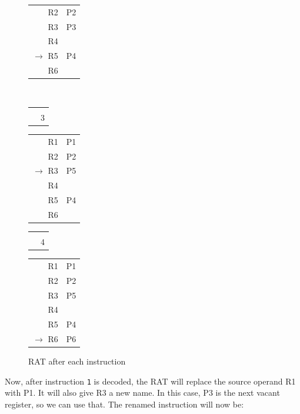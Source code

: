 \documentclass[12pt,a4paper]{article} %
\begin{document}
\begin{figure} [!htb]
\begin{minipage}{.2\textwidth}
\begin{tabularx} {\textwidth} {R | X|}
		R2					  & P2\\
		R3					  & P3\\
		R4					  & \\
		$\rightarrow$
		R5					  & P4\\
		R6					  & \\
	\end{tabularx}
	\end{minipage}
	\\%
	\vspace{0pt}%
	\hspace{.1\textwidth}%
	\begin{minipage}{.2\textwidth}
		\begin{tabularx} {\textwidth} {R  C}
			& \\
			& 3\\
		\end{tabularx}
	\begin{tabularx} {\textwidth} {R | X|}
		R1 					  & P1\\
		R2					  & P2\\
		$\rightarrow$
		R3					  & P5\\
		R4					  & \\
		R5					  & P4\\
		R6					  & \\
	\end{tabularx}
	\end{minipage}%
	\hspace{.1\textwidth}%
	\begin{minipage}{.2\textwidth}
		\begin{tabularx} {\textwidth} {R  C}
			& \\
			& 4\\
		\end{tabularx}
	\begin{tabularx} {\textwidth} {R | X|}
		R1 					  & P1\\
		R2					  & P2\\
		R3					  & P5\\
		R4					  & \\
		R5					  & P4\\
		$\rightarrow$
		R6					  & P6\\
	\end{tabularx}
	\end{minipage}%
	\vspace{.5cm}
	\caption{RAT after each instruction}
	\label{fig-RAT}
\end{figure}
Now, after instruction \texttt{1} is decoded, the RAT will replace the source operand R1 with P1. It will also give R3 a new name. In this case, P3 is the next vacant register, so we can use that. The renamed instruction will now be:
\end{document}
